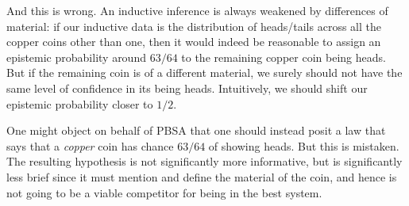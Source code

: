 And this is wrong. An inductive inference is always weakened by differences of material: if our inductive data is the distribution
of heads/tails across all the copper coins other than one, then it would indeed be reasonable to assign an epistemic probability
around $63/64$ to the remaining copper coin being heads. But if the remaining coin is of a different material, we surely should 
not have the same level of confidence in its being heads. Intuitively, we should shift our epistemic probability closer to $1/2$.

One might object on behalf of PBSA that one should instead posit a law that says that a \textit{copper} coin has chance 
$63/64$ of showing heads. But this is mistaken. The resulting hypothesis is not significantly more informative, but is significantly
less brief since it must mention and define the material of the coin, and hence is not going to be a viable competitor for being 
in the best system.




